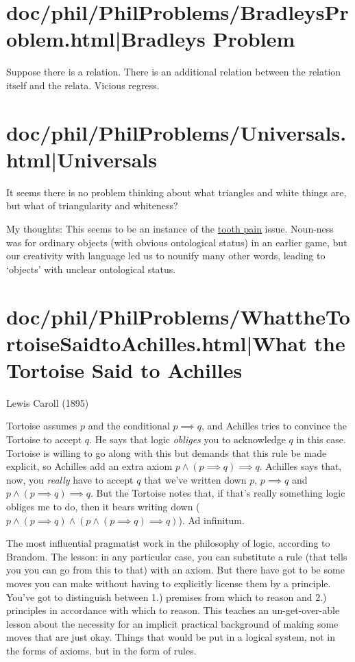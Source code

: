 \documentclass[12pt,a4paper]{report}
\begin{document}
\section{doc/phil/PhilProblems/BradleysProblem.html|Bradleys Problem}
Suppose there is a relation. There is an additional relation between the relation itself and the relata. Vicious regress.

\section{doc/phil/PhilProblems/Universals.html|Universals}
It seems there is no problem thinking about what triangles and white things are, but what of triangularity and whiteness?

My thoughts: This seems to be an instance of the \href{doc/phil/PhilSituations/ToothPain}{tooth pain} issue. Noun-ness was for ordinary objects (with obvious ontological status) in an earlier game, but our creativity with language led us to nounify many other words, leading to `objects' with unclear ontological status.
\section{doc/phil/PhilProblems/WhattheTortoiseSaidtoAchilles.html|What the Tortoise Said to Achilles}

Lewis Caroll (1895)

Tortoise assumes $p$ and the conditional $p \implies q$, and Achilles tries to convince the Tortoise to accept $q$. He says that logic \emph{obliges} you to acknowledge $q$ in this case. Tortoise is willing to go along with this but demands that this rule be made explicit, so Achilles add an extra axiom $p \land (p \implies q) \implies q$. Achilles says that, now, you \emph{really} have to accept $q$ that we've written down $p$, $p \implies q$ and $p \land (p \implies q) \implies q$. But the Tortoise notes that, if that's really something logic obliges me to do, then it bears writing down ($p \land (p \implies q) \land (p \land (p \implies q) \implies q)$). Ad infinitum.

The most influential pragmatist work in the philosophy of logic, according to Brandom. The lesson: in any particular case, you can substitute a rule (that tells you you can go from this to that) with an axiom. But there have got to be some moves you can make without having to explicitly license them by a principle.  You've got to distinguish between 1.) premises from which to reason and 2.) principles in accordance with which to reason. This teaches an un-get-over-able lesson about the necessity for an implicit practical background of making some moves that are just okay. Things that would be put in a logical system, not in the forms of axioms, but in the form of rules.
\end{document}
